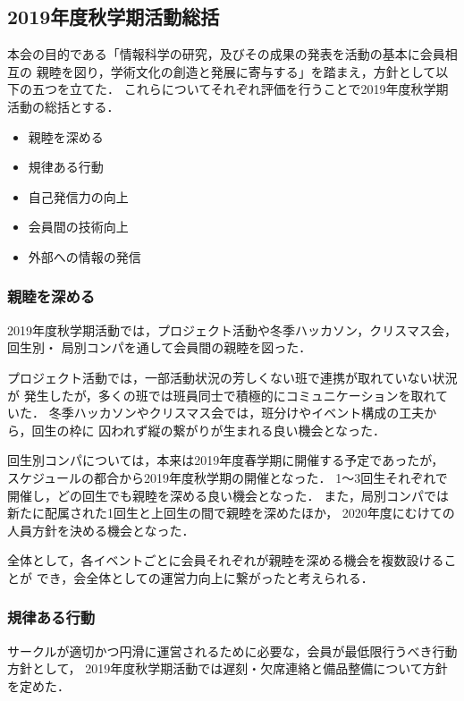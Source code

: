 \subsection*{2019年度秋学期活動総括}


本会の目的である「情報科学の研究，及びその成果の発表を活動の基本に会員相互の
親睦を図り，学術文化の創造と発展に寄与する」を踏まえ，方針として以下の五つを立てた．
これらについてそれぞれ評価を行うことで2019年度秋学期活動の総括とする．

\begin{itemize}
    \item 親睦を深める
    \item 規律ある行動
    \item 自己発信力の向上
    \item 会員間の技術向上
    \item 外部への情報の発信
\end{itemize}

\subsubsection*{親睦を深める}
2019年度秋学期活動では，プロジェクト活動や冬季ハッカソン，クリスマス会，回生別・
局別コンパを通して会員間の親睦を図った．

プロジェクト活動では，一部活動状況の芳しくない班で連携が取れていない状況が
発生したが，多くの班では班員同士で積極的にコミュニケーションを取れていた．
冬季ハッカソンやクリスマス会では，班分けやイベント構成の工夫から，回生の枠に
囚われず縦の繋がりが生まれる良い機会となった．

回生別コンパについては，本来は2019年度春学期に開催する予定であったが，
スケジュールの都合から2019年度秋学期の開催となった．
1〜3回生それぞれで開催し，どの回生でも親睦を深める良い機会となった．
また，局別コンパでは新たに配属された1回生と上回生の間で親睦を深めたほか，
2020年度にむけての人員方針を決める機会となった．

全体として，各イベントごとに会員それぞれが親睦を深める機会を複数設けることが
でき，会全体としての運営力向上に繋がったと考えられる．

\subsubsection*{規律ある行動}
サークルが適切かつ円滑に運営されるために必要な，会員が最低限行うべき行動方針として，
2019年度秋学期活動では遅刻・欠席連絡と備品整備について方針を定めた．

